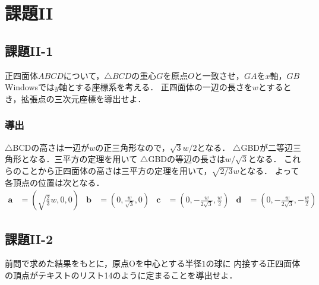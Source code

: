 \documentclass[]{jarticle}
\begin{document}
\section{課題II}
\subsection{課題II-1}
正四面体$ABCD$について，$\triangle BCD$の重心$G$を原点$O$と一致させ，$GA$を$x$軸，$GB$Windowsでは$y$軸とする座標系を考える．
正四面体の一辺の長さを$w$とするとき，拡張点の三次元座標を導出せよ．
\subsubsection{導出}
$\triangle$BCDの高さは一辺が$w$の正三角形なので，$\sqrt{3}w/2$となる．
$\triangle$GBDが二等辺三角形となる．三平方の定理を用いて
$\triangle$GBDの等辺の長さは$w/\sqrt{3}$となる．
これらのことから正四面体の高さは三平方の定理を用いて，$\sqrt{2/3}w$となる．
よって各頂点の位置は次となる．
\begin{align*}
  \bm{a} & = \left(\sqrt{\frac{2}{3}}w, 0, 0\right)             &
  \bm{b} & = \left(0, \frac{w}{\sqrt{3}}, 0\right)              &
  \bm{c} & = \left(0, -\frac{w}{2\sqrt{3}}, \frac{w}{2}\right)  &
  \bm{d} & = \left(0, -\frac{w}{2\sqrt{3}}, -\frac{w}{2}\right)
\end{align*}

\subsection{課題II-2}
前問で求めた結果をもとに，原点Oを中心とする半径$1$の球に
内接する正四面体の頂点がテキストのリスト14のように定まることを導出せよ．
\end{document}
